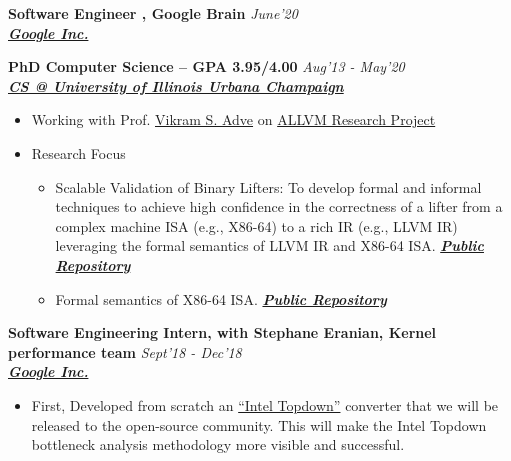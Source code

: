 \documentclass[9pt]{article}
\newenvironment{changemargin}[2]{%
  \begin{list}{}{%
    \setlength{\topsep}{0pt}%
    \setlength{\leftmargin}{#1}%
    \setlength{\rightmargin}{#2}%
    \setlength{\listparindent}{\parindent}%
    \setlength{\itemindent}{\parindent}%
    \setlength{\parsep}{\parskip}%
  }%
  \item[]}{\end{list}
}
\newenvironment{body} {
	\vspace*{-16pt}
	\begin{changemargin}{-0.25in}{-0.5in}
  }	
	{\end{changemargin}
}
\begin{document}
\begin{body}
	\vspace{14pt}

\textbf{Software Engineer , Google Brain} \hfill \emph{June'20}\\
\textbf{\emph{\href{https://www.google.com/intl/en/about/}{Google Inc.}}}

	\vspace{14pt}
 \medskip
        \textbf{PhD Computer Science -- GPA 3.95/4.00}{} \hfill \emph{Aug'13 - May'20}{} \\
	\textbf{\emph{\href{http://cs.illinois.edu/}{CS @ University of Illinois Urbana Champaign}}{}} \\
	\begin{itemize} \itemsep -0pt
            \item  Working with Prof.
              \href{http://vikram.cs.illinois.edu/}{Vikram S.
              Adve} on \href{https://publish.illinois.edu/allvm-project/}{ALLVM
              Research Project}
          \item Research Focus
            \begin{itemize} 
              \item Scalable Validation of Binary Lifters: To develop formal and informal techniques to
achieve high confidence in the correctness of a lifter from
a complex machine ISA (e.g., X86-64) to a rich IR (e.g.,
LLVM IR) leveraging the formal semantics of LLVM IR and X86-64 ISA. \textbf{\emph{{\href{https://github.com/sdasgup3/validating-binary-decompilation}{Public Repository}}}}

              \item Formal semantics of X86-64 ISA. \textbf{\emph{{\href{https://github.com/kframework/X86-64-semantics}{Public Repository}}}}


            \end{itemize} 
        \end{itemize}
    
 \medskip

        \textbf{Software Engineering Intern, with Stephane Eranian, Kernel performance team} \hfill \emph{Sept'18 - Dec'18}\\
	\textbf{\emph{\href{https://www.google.com/intl/en/about/}{Google Inc.}}}
	\begin{itemize} \itemsep -0pt


        \item First, Developed from scratch an
        \href{https://ieeexplore.ieee.org/document/6844459}{``Intel Topdown''}
        converter that we will be released to the open-source community. This will
        make the Intel Topdown bottleneck analysis methodology more visible and
        successful.


\end{itemize}
\end{body}
\end{document}
